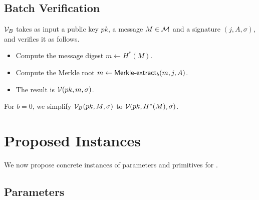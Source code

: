 \subsection{Batch Verification}

$\mathcal{V}_B$ takes as input a public key $pk$, a message $M \in \mathcal{M}$ and a signature $(j, A, \sigma)$, and verifies it as follows.

\begin{itemize}
\item Compute the message digest $m \gets H^*(M)$.
\item Compute the Merkle root $m \gets \textsf{Merkle-extract}_b(m, j, A)$.
\item The result is $\mathcal{V}(pk, m, \sigma)$.
\end{itemize}
%
For $b=0$, we simplify $\mathcal{V}_B(pk, M, \sigma)$ to $\mathcal{V}(pk, H^*(M), \sigma)$.


\section{Proposed Instances}

We now propose concrete instances of parameters and primitives for \gravity{}.

\subsection{Parameters}

